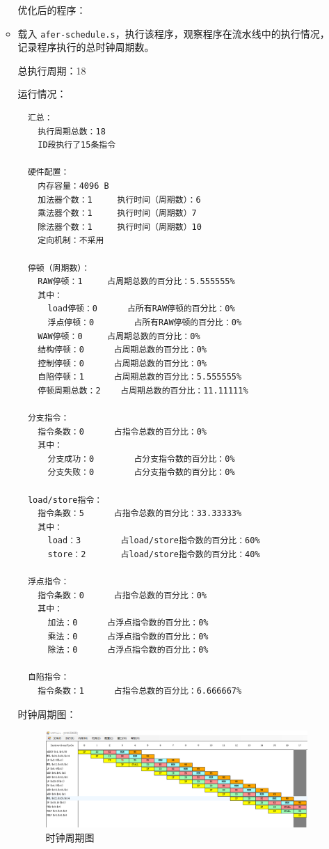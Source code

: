 \documentclass[blue,normal,cn]{elegantnote}
\newcommand{\code}[1]{\colorbox{light-gray}{\texttt{#1}}}
\begin{document}
\begin{enumerate}[wide=0pt, listparindent=2em, parsep=0pt]
\begin{itemize}[leftmargin=3em, listparindent=2em, parsep=0pt]
                    \textcolor{ans}{优化后的程序：}

                    

              \item  载入 \code{afer-schedule.s}，执行该程序，观察程序在流水线中的执行情况，记录程序执行的总时钟周期数。

                    \textcolor{ans}{总执行周期：18}

                    \textcolor{ans}{运行情况：}
                    \begin{lstlisting}
  汇总：
    执行周期总数：18
    ID段执行了15条指令

  硬件配置：
    内存容量：4096 B
    加法器个数：1		执行时间（周期数）：6
    乘法器个数：1		执行时间（周期数）7		
    除法器个数：1		执行时间（周期数）10		
    定向机制：不采用

  停顿（周期数）：
    RAW停顿：1		占周期总数的百分比：5.555555%
    其中：
      load停顿：0		占所有RAW停顿的百分比：0%
      浮点停顿：0		占所有RAW停顿的百分比：0%
    WAW停顿：0		占周期总数的百分比：0%
    结构停顿：0		占周期总数的百分比：0%
    控制停顿：0		占周期总数的百分比：0%
    自陷停顿：1		占周期总数的百分比：5.555555%
    停顿周期总数：2	占周期总数的百分比：11.11111%

  分支指令：
    指令条数：0		占指令总数的百分比：0%
    其中：
      分支成功：0		占分支指令数的百分比：0%
      分支失败：0		占分支指令数的百分比：0%

  load/store指令：
    指令条数：5		占指令总数的百分比：33.33333%
    其中：
      load：3		占load/store指令数的百分比：60%
      store：2		占load/store指令数的百分比：40%

  浮点指令：
    指令条数：0		占指令总数的百分比：0%
    其中：
      加法：0		占浮点指令数的百分比：0%
      乘法：0		占浮点指令数的百分比：0%
      除法：0		占浮点指令数的百分比：0%

  自陷指令：
    指令条数：1		占指令总数的百分比：6.666667%
\end{lstlisting}

                    \textcolor{ans}{时钟周期图：}
                    \begin{figure}[H]
                        \centering
                        \includegraphics[width=.8\textwidth]{fig/after-schedule.png}
                        \caption{时钟周期图}
                    \end{figure}


\end{itemize}
\end{enumerate}
\end{document}
